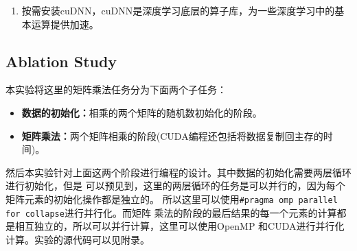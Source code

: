 \documentclass{article}
\begin{document}
\begin{enumerate}
    输入下面的指令和看到下面输出的结果之后，说明CUDA已经安装成功。
    \begin{lstlisting}[style=bashstyle]
(base) PS C:\Users\24692> nvcc -V
nvcc: NVIDIA (R) Cuda compiler driver
Copyright (c) 2005-2021 NVIDIA Corporation
Built on Fri_Dec_17_18:28:54_Pacific_Standard_Time_2021
Cuda compilation tools, release 11.6, V11.6.55
Build cuda_11.6.r11.6/compiler.30794723_0
(base) PS C:\Users\24692> nvidia-smi
Mon Apr  8 09:38:47 2024
NVIDIA-SMI 551.86   Driver Version: 551.86    CUDA Version: 12.4   
    \end{lstlisting}
    这里的CUDA Version和CUDA Toolkit的版本不一样是因为这里的CUDA Version是显卡支持的
    最高CUDA版本，而CUDA Toolkit是你安装的CUDA版本。
    \item 按需安装cuDNN，cuDNN是深度学习底层的算子库，为一些深度学习中的基本运算提供加速。
\end{enumerate}
\subsection{Ablation Study}
本实验将这里的矩阵乘法任务分为下面两个子任务：
\begin{itemize}
    \item \textbf{数据的初始化：}相乘的两个矩阵的随机数初始化的阶段。
    \item \textbf{矩阵乘法：}两个矩阵相乘的阶段(CUDA编程还包括将数据复制回主存的时间)。
\end{itemize}
然后本实验针对上面这两个阶段进行编程的设计。其中数据的初始化需要两层循环进行初始化，但是
可以预见到，这里的两层循环的任务是可以并行的，因为每个矩阵元素的初始化操作都是独立的。
所以这里可以使用\texttt{\#pragma omp parallel for collapse}进行并行化。而矩阵
乘法的阶段的最后结果的每一个元素的计算都是相互独立的，所以可以并行计算，这里可以使用OpenMP
和CUDA进行并行化计算。实验的源代码可以见附录。
\end{document}
